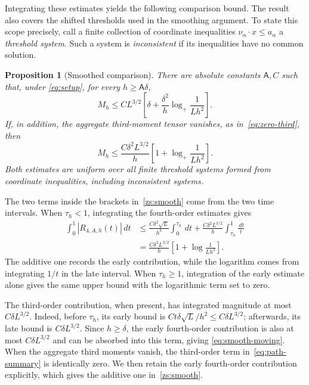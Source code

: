 \documentclass[11pt,letterpaper]{article}
\newtheorem{proposition}{Proposition}
\theoremstyle{remark}
\newcommand{\dd}{\,d}
\begin{document}
Integrating these estimates yields the following comparison bound.
The result also covers the shifted thresholds used in the smoothing
argument. To state this scope precisely, call a finite collection of
coordinate inequalities \(\nu_\alpha\cdot x\le a_\alpha\) a
\emph{threshold system}. Such a system is \emph{inconsistent} if its
inequalities have no common solution.

\begin{proposition}[Smoothed comparison]\label{prop:moving-cutoff}
\label{zs:smooth-proposition}
There are absolute constants \(\mathsf A,C\) such that, under
\eqref{eq:setup}, for every \(h\ge\mathsf A\delta\),
\begin{equation}
 M_h\le CL^{3/2}\left[
 \delta+\frac{\delta^2}{h}\log_+\frac1{Lh^2}\right].
 \tag{S*}\label{eq:smooth-moving}
\end{equation}
If, in addition, the aggregate third-moment tensor vanishes,
as in~\eqref{eq:zero-third}, then
\begin{equation}
 M_h\le\frac{C\delta^2L^{3/2}}h
 \left[1+\log_+\frac1{Lh^2}\right].
 \label{zs:smooth}
\end{equation}
Both estimates are uniform over all finite threshold systems formed from
coordinate inequalities, including inconsistent systems.
\end{proposition}

The two terms inside the brackets in~\eqref{zs:smooth} come from the
two time intervals. When \(\tau_h<1\), integrating the fourth-order
estimates gives
\[
 \begin{aligned}
 \int_0^1|R_{4,A,h}(t)|\dd t
 &\le\frac{C\delta^2\sqrt L}{h^3}\int_0^{\tau_h}\dd t
    +\frac{C\delta^2L^{3/2}}h\int_{\tau_h}^1\frac{\dd t}{t}\\
 &=\frac{C\delta^2L^{3/2}}h
    \left[1+\log\frac1{Lh^2}\right].
 \end{aligned}
\]
The additive one records the early contribution, while the logarithm
comes from integrating \(1/t\) in the late interval. When
\(\tau_h\ge1\), integration of the early estimate alone gives the
same upper bound with the logarithmic term set to zero.

The third-order contribution, when present, has integrated magnitude
at most \(C\delta L^{3/2}\). Indeed, before \(\tau_h\), its early
bound is \(Ct\delta\sqrt L/h^2\le C\delta L^{3/2}\); afterwards,
its late bound is \(C\delta L^{3/2}\). Since \(h\ge\delta\), the
early fourth-order contribution is also at most
\(C\delta L^{3/2}\) and can be absorbed into this term, giving
\eqref{eq:smooth-moving}. When the aggregate third moments vanish,
the third-order term in~\eqref{eq:path-summary} is identically zero.
We then retain the early fourth-order contribution explicitly, which
gives the additive one in~\eqref{zs:smooth}.
\end{document}
